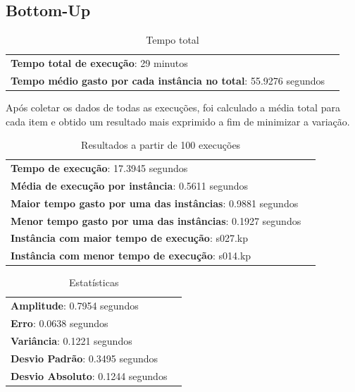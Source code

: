 \documentclass[a4paper, 12pt]{article}
\begin{document}
\hrulefill

\subsection{Bottom-Up}
\begin{table}[!htb]
    \begin{tabular}{ll}
        {\bf Tempo total de execução}: 29 minutos\\
        {\bf Tempo médio gasto por cada instância no total}: 55.9276 segundos
    \end{tabular}
    \caption{Tempo total}
    \label{tab:total_bottomup}
\end{table}
Após coletar os dados de todas as execuções, foi calculado a média total para cada item e obtido um resultado 
mais exprimido a fim de minimizar a variação.
\begin{table}[!htb]
    \begin{tabular}{ll}
        {\bf Tempo de execução}: 17.3945 segundos\\
        {\bf Média de execução por instância}: 0.5611 segundos\\
        {\bf Maior tempo gasto por uma das instâncias}: 0.9881 segundos\\
        {\bf Menor tempo gasto por uma das instâncias}: 0.1927 segundos \\
        {\bf Instância com maior tempo de execução}: s027.kp\\
        {\bf Instância com menor tempo de execução}: s014.kp
    \end{tabular}
    \caption{Resultados a partir de 100 execuções}
    \label{tab:result_tot_bottomup}
\end{table}


\begin{table}[!htb]
    \begin{tabular}{ll}
        {\bf Amplitude}: 0.7954 segundos\\
        {\bf Erro}: 0.0638 segundos\\
        {\bf Variância}: 0.1221 segundos\\
        {\bf Desvio Padrão}: 0.3495 segundos\\
        {\bf Desvio Absoluto}: 0.1244 segundos
    \end{tabular}
    \caption{Estatísticas}
    \label{tab:estatistica_tot_bottomup}
\end{table}
\end{document}
